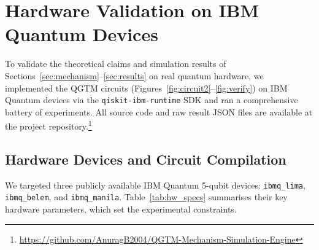 %     

\section{Hardware Validation on IBM Quantum Devices}
\label{sec:hardware}

To validate the theoretical claims and simulation results of
Sections~\ref{sec:mechanism}--\ref{sec:results} on real quantum hardware,
we implemented the QGTM circuits (Figures~\ref{fig:circuit2}--\ref{fig:verify})
on IBM Quantum devices via the \texttt{qiskit-ibm-runtime} SDK and ran a
comprehensive battery of experiments.
All source code and raw result JSON files are available at the project
repository.\footnote{\url{https://github.com/AnuragB2004/QGTM-Mechanism-Simulation-Engine}}

\subsection{Hardware Devices and Circuit Compilation}
\label{subsec:hw_devices}

We targeted three publicly available IBM Quantum 5-qubit devices:
\texttt{ibmq\_lima}, \texttt{ibmq\_belem}, and \texttt{ibmq\_manila}.
Table~\ref{tab:hw_specs} summarises their key hardware parameters, which set
the experimental constraints.

\begin{table}[!t]
\centering
\caption{IBM Quantum Device Specifications (measured at time of experiments)}
\label{tab:hw_specs}
\renewcommand{\arraystretch}{1.35}
\end{table}


